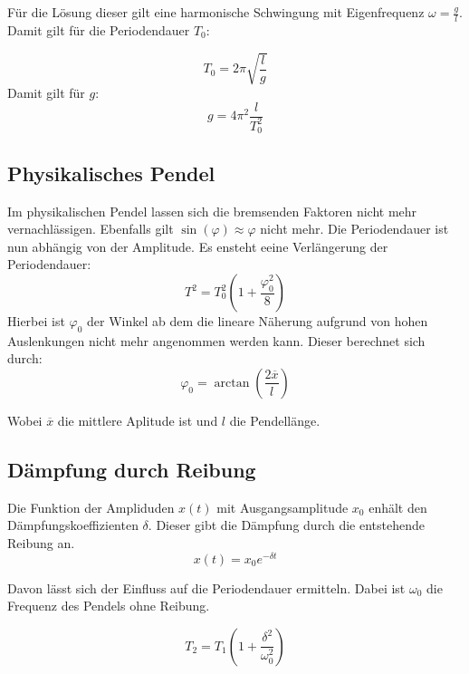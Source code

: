 Für die Lösung dieser gilt eine harmonische Schwingung mit Eigenfrequenz $\omega = \tfrac{g}{l}$.
Damit gilt für die Periodendauer $T_0$:

\begin{equation}
    T_0 = 2\pi \sqrt{\frac{l}{g}}
    \label{eq:Tnorm}
\end{equation}
Damit gilt für $g$:
\begin{equation}
    g = 4\pi^2 \frac{l}{T_0^2}
\end{equation}

\subsection{Physikalisches Pendel}

Im physikalischen Pendel lassen sich die bremsenden Faktoren nicht mehr vernachlässigen.
Ebenfalls gilt $\sin(\varphi) \approx \varphi$ nicht mehr. Die Periodendauer ist nun abhängig von der Amplitude.
Es ensteht eeine Verlängerung der Periodendauer:
\begin{equation}
    T^2= T_0^2(1 + \frac{\varphi_0^2}{8})
\end{equation}
Hierbei ist $\varphi_0$ der Winkel ab dem die lineare Näherung aufgrund von hohen Auslenkungen nicht mehr angenommen werden kann.
Dieser berechnet sich durch:
\begin{equation}
    \varphi_0 = \arctan\left(\frac{2\overline{x}}{l}\right)
    \label{eq:phi}
\end{equation}

Wobei $\overline{x}$ die mittlere Aplitude ist und $l$ die Pendellänge.

\subsection{Dämpfung durch Reibung}
Die Funktion der Ampliduden $x(t)$ mit Ausgangsamplitude $x_0$  enhält den Dämpfungskoeffizienten $\delta$.
Dieser gibt die Dämpfung durch die entstehende Reibung an.
\begin{equation}
    x(t) = x_0 e^{-\delta t}
\end{equation}

Davon lässt sich der Einfluss auf die Periodendauer ermitteln. Dabei ist $\omega_0$ die Frequenz des Pendels ohne Reibung.

\begin{equation}
    T_2 = T_1(1+ \frac{\delta ^2}{\omega_0 ^2})
\end{equation}

